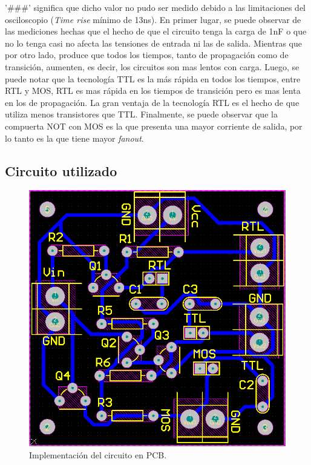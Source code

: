 \noindent
'\#\#\#' significa que dicho valor no pudo ser medido debido a las limitaciones del osciloscopio (\textit{Time rise} m\'inimo de 13ns).
\noindent\newline
\vspace{5mm}
\newline
En primer lugar, se puede observar de las mediciones hechas que el hecho de que el circuito tenga la carga de 1nF o que no lo tenga casi no afecta las tensiones de entrada ni las de salida. Mientras que por otro lado, produce que todos los tiempos, tanto de propagaci\'on como de transici\'on, aumenten, es decir, los circuitos son mas lentos con carga. \newline
Luego, se puede notar que la tecnolog\'ia TTL es la m\'as r\'apida en todos los tiempos, entre RTL y MOS, RTL es mas r\'apida en los tiempos de transici\'on pero es mas lenta en los de propagaci\'on. La gran ventaja de la tecnolog\'ia RTL es el hecho de que utiliza menos transistores que TTL. Finalmente, se puede observar que la compuerta NOT con MOS es la que presenta una mayor corriente de salida, por lo tanto es la que tiene mayor \textit{fanout}.

\subsection{Circuito utilizado}
\label{ej1_pcb}
\begin{figure}[H]
\center
    \includegraphics[scale = 0.55]{figs/ej1/ej1_PCB.png}
    \caption{Implementaci\'on del circuito en PCB.}
\label{fig:ej1_pcb}
\end{figure}
\noindent\newline